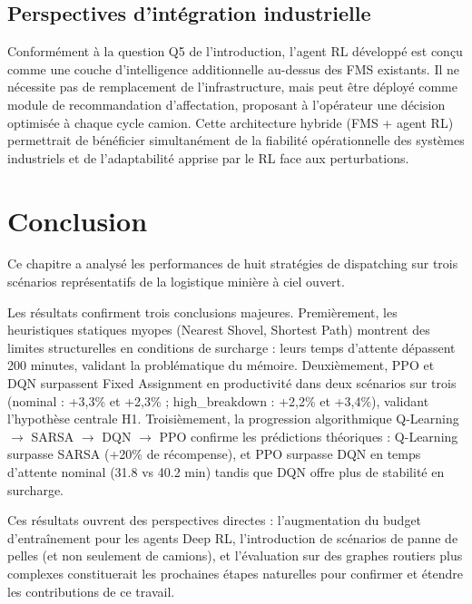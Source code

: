 \documentclass[11pt,a4paper]{report}
\begin{document}
\subsection{Perspectives d'intégration industrielle}

Conformément à la question Q5 de l'introduction, l'agent RL développé est conçu comme une couche d'intelligence additionnelle au-dessus des FMS existants. Il ne nécessite pas de remplacement de l'infrastructure, mais peut être déployé comme module de recommandation d'affectation, proposant à l'opérateur une décision optimisée à chaque cycle camion. Cette architecture hybride (FMS + agent RL) permettrait de bénéficier simultanément de la fiabilité opérationnelle des systèmes industriels et de l'adaptabilité apprise par le RL face aux perturbations.

\section{Conclusion}
\label{sec:conclusion-resultats}

Ce chapitre a analysé les performances de huit stratégies de dispatching sur trois scénarios représentatifs de la logistique minière à ciel ouvert.

Les résultats confirment trois conclusions majeures. Premièrement, les heuristiques statiques myopes (Nearest Shovel, Shortest Path) montrent des limites structurelles en conditions de surcharge : leurs temps d'attente dépassent 200 minutes, validant la problématique du mémoire. Deuxièmement, PPO et DQN surpassent Fixed Assignment en productivité dans deux scénarios sur trois (nominal : +3{,}3\% et +2{,}3\% ; high\_breakdown : +2{,}2\% et +3{,}4\%), validant l'hypothèse centrale H1. Troisièmement, la progression algorithmique Q-Learning $\to$ SARSA $\to$ DQN $\to$ PPO confirme les prédictions théoriques : Q-Learning surpasse SARSA (+20\% de récompense), et PPO surpasse DQN en temps d'attente nominal (31.8 vs 40.2 min) tandis que DQN offre plus de stabilité en surcharge.

Ces résultats ouvrent des perspectives directes : l'augmentation du budget d'entraînement pour les agents Deep RL, l'introduction de scénarios de panne de pelles (et non seulement de camions), et l'évaluation sur des graphes routiers plus complexes constituerait les prochaines étapes naturelles pour confirmer et étendre les contributions de ce travail.

\end{document}
